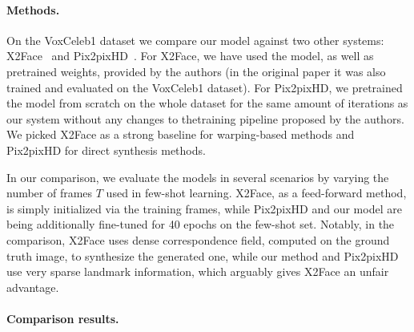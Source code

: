 \documentclass[10pt,twocolumn,letterpaper]{article}
\begin{document}
\paragraph{Methods.}

On the VoxCeleb1 dataset we compare our model against two other systems: X2Face~\cite{Wiles18} and Pix2pixHD~\cite{Wang18b}. For X2Face, we have used the model, as well as pretrained weights, provided by the authors (in the original paper it was also trained and evaluated on the VoxCeleb1 dataset). For Pix2pixHD, we pretrained the model from scratch on the whole dataset for the same amount of iterations as our system without any changes to thetraining pipeline proposed by the authors. We picked X2Face as a strong baseline for warping-based methods and Pix2pixHD for direct synthesis methods.

In our comparison, we evaluate the models in several scenarios by varying the number of frames $T$ used in few-shot learning. X2Face, as a feed-forward method, is simply initialized via the training frames, while Pix2pixHD and our model are being additionally fine-tuned for 40 epochs on the few-shot set. Notably, in the comparison, X2Face uses dense correspondence field, computed on the ground truth image, to synthesize the generated one, while our method and Pix2pixHD use very sparse landmark information, which arguably gives X2Face an unfair advantage.

\paragraph{Comparison results.}
\end{document}

